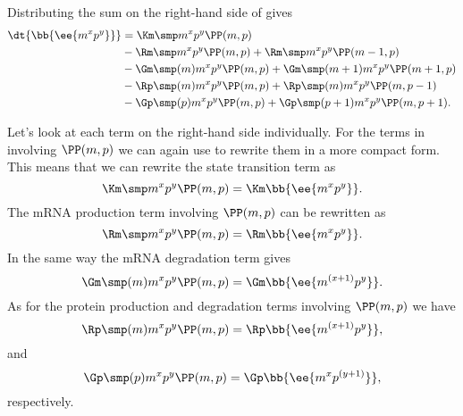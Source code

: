 Distributing the sum on the right-hand
side of  gives
\begin{equation}
  \begin{aligned}
    \dt{\bb{\ee{m^x p^y}}} &=
    \Km \smp m^x p^y \PP(m, p)\\
    &- \Rm \smp m^x p^y \PP(m, p) + \Rm \smp m^x p^y \PP(m-1, p)\\
    &- \Gm \smp (m) m^x p^y \PP(m, p) + \Gm \smp (m + 1) m^x p^y \PP(m + 1, p)\\
    &- \Rp \smp (m) m^x p^y \PP(m, p) + \Rp \smp (m) m^x p^y \PP(m, p - 1)\\
    &- \Gp \smp (p) m^x p^y \PP(m, p) + \Gp \smp (p + 1) m^x p^y \PP(m, p + 1).
  \end{aligned}
  \label{eq_master_sum}
\end{equation}

Let's look at each term on the right-hand side individually. For the terms in
 involving $\PP(m, p)$ we can again use 
to rewrite them in a more compact form. This means that we can rewrite the
state transition term as
\begin{equation}
  \Km \smp m^x p^y \PP(m, p) = \Km \bb{\ee{m^x p^y}}.
\end{equation}
The mRNA production term involving $\PP(m, p)$ can be rewritten as
\begin{equation}
  \Rm \smp m^x p^y \PP(m, p) = \Rm \bb{\ee{m^x p^y}}.
\end{equation}
In the same way the mRNA degradation term gives
\begin{equation}
  \Gm \smp (m) m^x p^y \PP(m, p) = \Gm \bb{\ee{m^{(x + 1)} p^y}}.
\end{equation}
As for the protein production and degradation terms involving $\PP(m, p)$ we
have
\begin{equation}
  \Rp \smp (m) m^x p^y \PP(m, p) = \Rp \bb{\ee{m^{(x + 1)} p^y}},
\end{equation}
and
\begin{equation}
  \Gp \smp (p) m^x p^y \PP(m, p) = \Gp \bb{\ee{m^x p^{(y + 1)}}},
\end{equation}
respectively.

